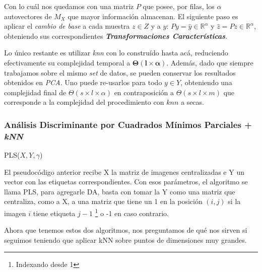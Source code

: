 Con lo cu\'al nos quedamos con una matriz $P$ que posee, por filas, los $\alpha$ autovectores de $M_{X}$ que mayor informaci\'on almacenan. El siguiente paso es aplicar el \textit{cambio de base} a cada muestra $z \in Z$ y a $y$: $Py = \hat{y} \in \mathbb{R}^{\alpha}$ y $\hat{z} = Pz \in \mathbb{R}^{\alpha}$, obteniendo sus correspondientes \textit{\textbf{Transformaciones Caracter\'isticas}}.

Lo \'unico restante es utilizar \textit{knn} con lo constru\'ido hasta ac\'a, reduciendo efectivamente su complejidad temporal a $\mathbf{\Theta(l \times \alpha)}$. Adem\'as, dado que siempre trabajamos sobre el mismo \textit{set} de datos, se pueden conservar los resultados obtenidos en \textit{PCA}. Uno puede re-usarlos para todo $y \in Y$, obteniendo una complejidad final de $\Theta(s \times l \times \alpha)$ en contraposici\'on a $\Theta(s \times l \times m)$ que corresponde a la complejidad del procedimiento con $knn$ a secas.

\subsubsection{An\'alisis Discriminante por Cuadrados M\'inimos Parciales + \textit{kNN}}

\begin{algorithm}
\begin{algorithmic}[1]
 
\ENDFOR
{}
\end{algorithmic}
\caption{PLS($X, Y, \gamma$)}
\end{algorithm}

El pseudoc\'odigo anterior recibe X la matriz de imagenes centralizadas e Y un vector con las etiquetas correspondientes. Con esos par\'ametros, el algoritmo se llama PLS, para agregarle DA, basta con tomar la Y como una matriz que centraliza, como a X, a una matriz que tiene un 1 en la posici\'on $(i, j)$ si la imagen $i$ tiene etiqueta $j-1$ \footnote{Indexando desde 1} o -1 en caso contrario.

Ahora que tenemos estos dos algoritmos, nos preguntamos de qu\'e nos sirven si seguimos teniendo que aplicar kNN sobre puntos de dimensiones muy grandes.

